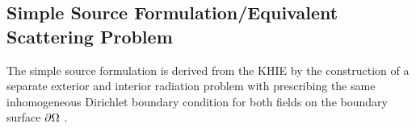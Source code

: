 

\subsection{Simple Source Formulation/Equivalent Scattering Problem}
The simple source formulation is derived from the KHIE by the construction of a separate exterior and interior radiation problem with prescribing the same inhomogeneous Dirichlet boundary condition for both fields on the boundary surface $\partial \Omega$ \cite{Ahrens2012}.

